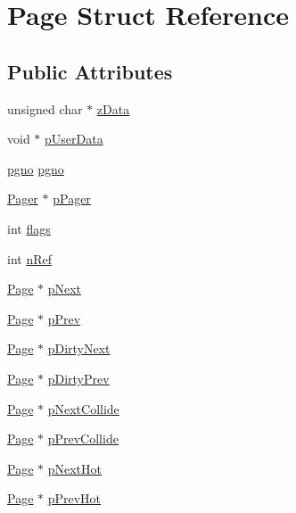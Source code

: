 \hypertarget{struct_page}{\section{Page Struct Reference}
\label{df/d9b/struct_page}
}
\subsection*{Public Attributes}
\begin{DoxyCompactItemize}
\item 
unsigned char $\ast$ \hyperlink{struct_page_a87938872ca8631cd16a3a10e6256f9ab}{z\-Data}
\item 
void $\ast$ \hyperlink{struct_page_aa1e91f31c9d426367c0fe43a8e4ee5b3}{p\-User\-Data}
\item 
\hyperlink{unqlite_8c_a90bf132c9229151f7c29e84e592907cd}{pgno} \hyperlink{struct_page_a98ebb8cf4e3f5ced9307e5d17a5a7fa9}{pgno}
\item 
\hyperlink{struct_pager}{Pager} $\ast$ \hyperlink{struct_page_a9c47742ca02036cd21b8bdf91a096f79}{p\-Pager}
\item 
int \hyperlink{struct_page_aa3e3b457d87c66b71e9b497bb44d5d43}{flags}
\item 
int \hyperlink{struct_page_a000e1e83db5042ff7d574299f2b0b093}{n\-Ref}
\item 
\hyperlink{struct_page}{Page} $\ast$ \hyperlink{struct_page_a9fc270c447b64cd3c9af9538f0820d34}{p\-Next}
\item 
\hyperlink{struct_page}{Page} $\ast$ \hyperlink{struct_page_aa7da591fa65639c5bf1155e15ce946af}{p\-Prev}
\item 
\hyperlink{struct_page}{Page} $\ast$ \hyperlink{struct_page_a2c5d338f00c7d03796278b256e86f873}{p\-Dirty\-Next}
\item 
\hyperlink{struct_page}{Page} $\ast$ \hyperlink{struct_page_a8446031d1392ff11e0f32bdd9f099111}{p\-Dirty\-Prev}
\item 
\hyperlink{struct_page}{Page} $\ast$ \hyperlink{struct_page_aacc17fefbd9277940655438cfc31ff44}{p\-Next\-Collide}
\item 
\hyperlink{struct_page}{Page} $\ast$ \hyperlink{struct_page_a95d9164851163f3d954a155fa6e41ea0}{p\-Prev\-Collide}
\item 
\hyperlink{struct_page}{Page} $\ast$ \hyperlink{struct_page_a4c0d4da87f19e8df1027bdf38a75d7fb}{p\-Next\-Hot}
\item 
\hyperlink{struct_page}{Page} $\ast$ \hyperlink{struct_page_a3f8c2bed73ebe5c160e8166603ea3e9c}{p\-Prev\-Hot}
\end{DoxyCompactItemize}



